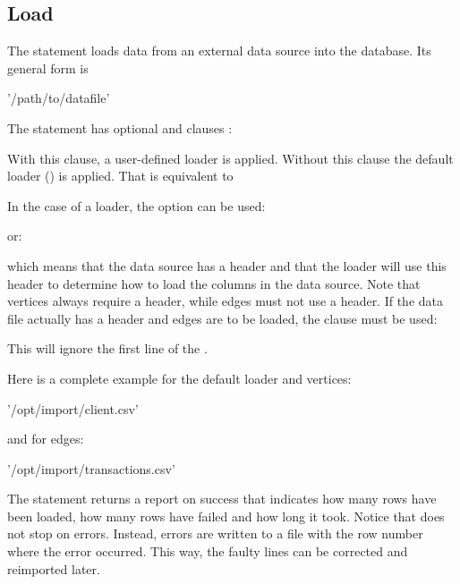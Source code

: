 
\subsection{Load}
The  statement loads data from an external
data source into the database.
Its general form is

 '/path/to/datafile'  

The  statement has optional  and  clauses
:

 

With this clause, a user-defined loader is applied.
Without this clause the default loader ()
is applied. That is equivalent to

 

In the case of a  loader,
the  option can be used:


or:


which means that the data source has a header and that the loader
will use this header to determine how to load the columns in the data source.
Note that vertices always require a header, while edges
must not use a header. If the data file actually has a header
and edges are to be loaded, the  clause must be used:


This will ignore the first line of the .

Here is a complete example for the default loader and vertices:

 '/opt/import/client.csv'
  

and for edges:

 '/opt/import/transactions.csv'
 

The  statement returns a report on success
that indicates how many rows have been loaded,
how many rows have failed and how long it took.
Notice that  does not stop on errors.
Instead, errors are written to a file
with the row number where the error occurred.
This way, the faulty lines can be corrected and
reimported later.


